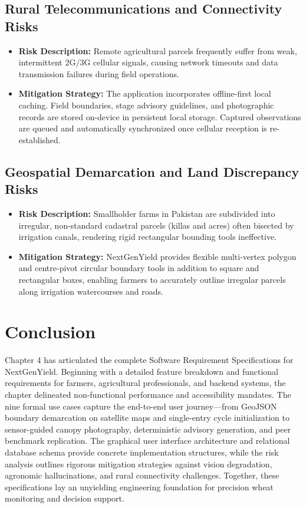 \documentclass{FastFyp}
\begin{document}
\subsection{Rural Telecommunications and Connectivity Risks}
\begin{itemize}
    \item \textbf{Risk Description:} Remote agricultural parcels frequently suffer from weak, intermittent $2\text{G}/3\text{G}$ cellular signals, causing network timeouts and data transmission failures during field operations.
    \item \textbf{Mitigation Strategy:} The application incorporates offline-first local caching. Field boundaries, stage advisory guidelines, and photographic records are stored on-device in persistent local storage. Captured observations are queued and automatically synchronized once cellular reception is re-established.
\end{itemize}

\subsection{Geospatial Demarcation and Land Discrepancy Risks}
\begin{itemize}
    \item \textbf{Risk Description:} Smallholder farms in Pakistan are subdivided into irregular, non-standard cadastral parcels (killas and acres) often bisected by irrigation canals, rendering rigid rectangular bounding tools ineffective.
    \item \textbf{Mitigation Strategy:} NextGenYield provides flexible multi-vertex polygon and centre-pivot circular boundary tools in addition to square and rectangular boxes, enabling farmers to accurately outline irregular parcels along irrigation watercourses and roads.
\end{itemize}

\clearpage
\section{Conclusion}
Chapter 4 has articulated the complete Software Requirement Specifications for NextGenYield. Beginning with a detailed feature breakdown and functional requirements for farmers, agricultural professionals, and backend systems, the chapter delineated non-functional performance and accessibility mandates. The nine formal use cases capture the end-to-end user journey---from GeoJSON boundary demarcation on satellite maps and single-entry cycle initialization to sensor-guided canopy photography, deterministic advisory generation, and peer benchmark replication. The graphical user interface architecture and relational database schema provide concrete implementation structures, while the risk analysis outlines rigorous mitigation strategies against vision degradation, agronomic hallucinations, and rural connectivity challenges. Together, these specifications lay an unyielding engineering foundation for precision wheat monitoring and decision support.
\end{document}
